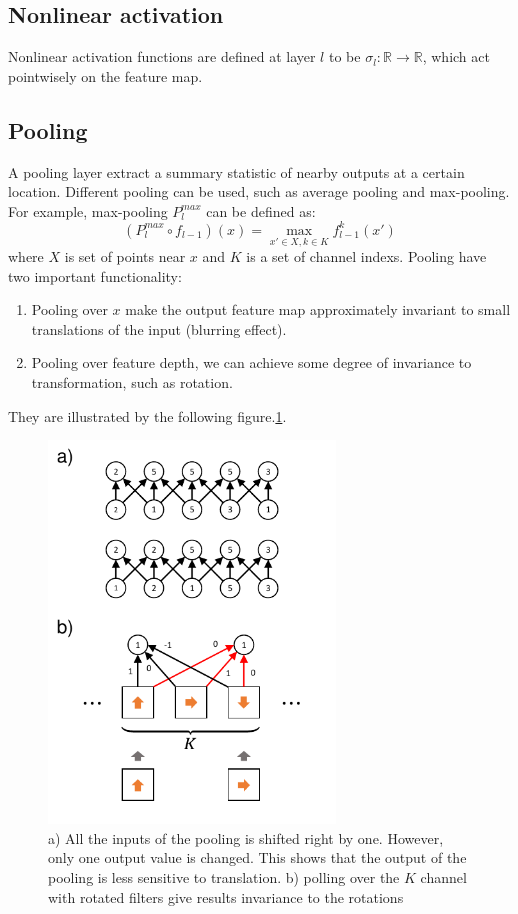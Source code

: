 \documentclass{IEEEtran}
\begin{document}
\subsection*{Nonlinear activation}
Nonlinear activation functions are defined at layer $l$ to be $\sigma_l:\mathbb{R} \to \mathbb{R}$, which act pointwisely on the feature map.

\subsection*{Pooling}
A pooling layer extract a summary statistic of nearby outputs at a certain location. Different pooling can be 
used, such as average pooling and max-pooling. For example, max-pooling $P^{max}_l$ can be defined as:
\begin{equation}
    (P^{max}_l \circ f_{l-1}) (x) = \max_{x' \in X, k \in K} f_{l-1}^k(x')
\end{equation}
where $X$ is set of points near $x$ and $K$ is a set of channel indexs.
Pooling have two important functionality:
\begin{enumerate}
    \item Pooling over $x$ make the output feature map approximately invariant to small translations of the input (blurring effect).
    \item Pooling over feature depth, we can achieve some degree of invariance to transformation, such as rotation.
\end{enumerate}
They are illustrated 
by the following figure.\ref{F:pooling}.
\begin{figure}[h!]
    \centering
    \includegraphics[width=3in]{figures/pooling.pdf}
    \caption{a) All the inputs of the pooling is shifted right by one. However, only one output value is changed. This shows that the output
            of the pooling is less sensitive to translation. 
            b) polling over the $K$ channel with rotated filters give results invariance to the rotations}
    \label{F:pooling}
\end{figure}
\end{document}
